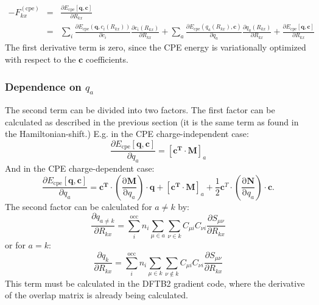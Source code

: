 \documentclass{article}
\numberwithin{equation}{section}
\begin{document}
\begin{eqnarray}
-F_{kx}^\mathrm{(cpe)} &=& \frac{\partial E_\mathrm{{cpe}}\left[\mathbf{q}, \mathbf{c}\right]}{\partial R_{kx}} \nonumber\\
    &=& \sum_i \frac{\partial E_\mathrm{{cpe}}\left(\mathbf{q}, c_{i}(R_{kx})\right)}{\partial c_{i}}    
    \frac{\partial c_{i}(R_{kx})}{\partial R_{kx}} 
    + \sum_a \frac{\partial E_\mathrm{{cpe}}\left(q_a(R_{kx}), \mathbf{c}\right)}{\partial q_a}    
    \frac{\partial q_a(R_{kx})}{\partial R_{kx}} 
    + \frac{\partial E_\mathrm{{cpe}}\left[\mathbf{q}, \mathbf{c}\right]}{\partial R_{kx}}
\end{eqnarray}
The first derivative term is zero, since the CPE energy is variationally optimized with respect to the $\mathbf{c}$ coefficients. 
\subsubsection{Dependence on $q_a$}
The second term can be divided into two factors. The first factor can be calculated as described in the previous section (it is the same term as found in the Hamiltonian-shift.) 
E.g. in the CPE charge-independent case:
\begin{equation}
    \frac{\partial E_{\mathrm{cpe}}\left[\mathbf{q}, \mathbf{c}\right]}{\partial q_a} = [\mathbf{c^T}  \cdot \mathbf{M}]_a
\end{equation}
And in the CPE charge-dependent case:
\begin{equation}
    \frac{\partial E_{\mathrm{cpe}}\left[\mathbf{q}, \mathbf{c}\right]}{\partial q_a} = 
    \mathbf{c^T} \cdot \left( \frac{\mathrm{\partial}\mathbf{M}}{\mathrm{\partial}q_a}\right) \cdot \mathbf{q} 
    + [\mathbf{c^T}  \cdot \mathbf{M}]_a + \frac{1}{2}\mathbf{c}^T \cdot \left( \frac{\mathrm{\partial}\mathbf{N}}{\mathrm{\partial}q_a}\right) \cdot \mathbf{c}. 
\end{equation}
The second factor can be calculated for $a \neq k$ by:\cite{dftb3}
\begin{equation}
    \frac{\partial q_{a\neq k}}{\partial R_{kx}} 
    = \sum_i^\mathrm{occ} n_i \sum_{\mu \in a} \sum_{\nu \in k}  C_{\mu i} C_{\nu i}\frac{\partial S_{\mu\nu}}{\partial R_{kx}}
\end{equation}
or for $a=k$:
\begin{equation}
    \frac{\partial q_{k}}{\partial R_{kx}} 
    = \sum_i^\mathrm{occ} n_i \sum_{\mu \in k} \sum_{\nu \not\in k}  C_{\mu i} C_{\nu i}\frac{\partial S_{\mu\nu}}{\partial R_{kx}}
\end{equation}
This term must be calculated in the DFTB2 gradient code, where the derivative of the overlap matrix is already being calculated.
\end{document}
